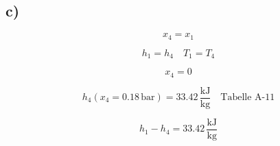 

\subsection*{c)}

\[
x_4 = x_1
\]

\[
h_1 = h_4 \quad \boxed{T_1 = T_4}
\]

\[
x_4 = 0
\]

\[
h_4 \left( x_4 = 0.18 \, \text{bar} \right) = 33.42 \, \frac{\text{kJ}}{\text{kg}} \quad \text{Tabelle A-11}
\]

\[
h_1 - h_4 = 33.42 \, \frac{\text{kJ}}{\text{kg}}
\]